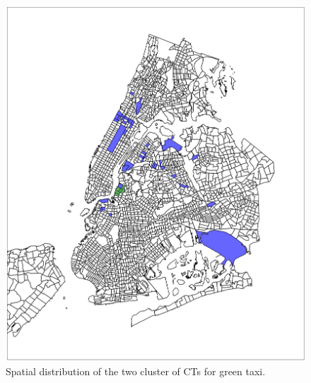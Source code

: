 \documentclass[journal]{IEEEtran}
\begin{document}
\begin{figure}[!t]
  \centering
  \includegraphics[width=1.0\columnwidth]{./figs/coloring_green.jpg}
  \caption{Spatial distribution of the two cluster of CTs for green taxi.}
  \label{fig:coloring_green}
\end{figure}
\end{document}
